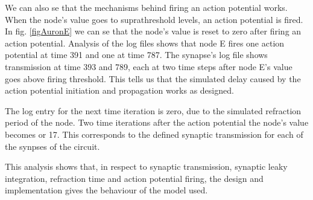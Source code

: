 	We can also se that the mechanisms behind firing an action potential works. 
	When the node's value goes to suprathreshold levels, an action potential is fired. %
	In fig. \ref{figAuronE} we can se that the node's value is reset to zero after firing an action potential.
	Analysis of the log files shows that node E fires one action potential at time 391 and one at time 787.
	The synapse's log file shows transmission at time 393 and 789, each at two time steps after node E's value goes above firing threshold.
	This tells us that the simulated delay caused by the action potential initiation and propagation works as designed.
	
	The log entry for the next time iteration is zero, due to the simulated refraction period of the node.
	Two time iterations after the action potential the node's value becomes or 17. %
	This corresponds to the defined synaptic transmission for each of the synpses of the circuit. %

	This analysis shows that, in respect to synaptic transmission, synaptic leaky integration, refraction time and action potential firing, the design and implementation gives the behaviour of the model used. 




